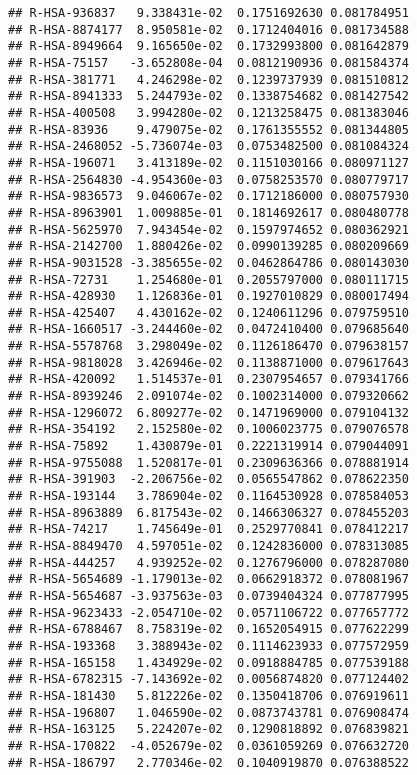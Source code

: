 \documentclass[
]{article}
\begin{document}
\begin{verbatim}
## R-HSA-936837   9.338431e-02  0.1751692630 0.081784951
## R-HSA-8874177  8.950581e-02  0.1712404016 0.081734588
## R-HSA-8949664  9.165650e-02  0.1732993800 0.081642879
## R-HSA-75157   -3.652808e-04  0.0812190936 0.081584374
## R-HSA-381771   4.246298e-02  0.1239737939 0.081510812
## R-HSA-8941333  5.244793e-02  0.1338754682 0.081427542
## R-HSA-400508   3.994280e-02  0.1213258475 0.081383046
## R-HSA-83936    9.479075e-02  0.1761355552 0.081344805
## R-HSA-2468052 -5.736074e-03  0.0753482500 0.081084324
## R-HSA-196071   3.413189e-02  0.1151030166 0.080971127
## R-HSA-2564830 -4.954360e-03  0.0758253570 0.080779717
## R-HSA-9836573  9.046067e-02  0.1712186000 0.080757930
## R-HSA-8963901  1.009885e-01  0.1814692617 0.080480778
## R-HSA-5625970  7.943454e-02  0.1597974652 0.080362921
## R-HSA-2142700  1.880426e-02  0.0990139285 0.080209669
## R-HSA-9031528 -3.385655e-02  0.0462864786 0.080143030
## R-HSA-72731    1.254680e-01  0.2055797000 0.080111715
## R-HSA-428930   1.126836e-01  0.1927010829 0.080017494
## R-HSA-425407   4.430162e-02  0.1240611296 0.079759510
## R-HSA-1660517 -3.244460e-02  0.0472410400 0.079685640
## R-HSA-5578768  3.298049e-02  0.1126186470 0.079638157
## R-HSA-9818028  3.426946e-02  0.1138871000 0.079617643
## R-HSA-420092   1.514537e-01  0.2307954657 0.079341766
## R-HSA-8939246  2.091074e-02  0.1002314000 0.079320662
## R-HSA-1296072  6.809277e-02  0.1471969000 0.079104132
## R-HSA-354192   2.152580e-02  0.1006023775 0.079076578
## R-HSA-75892    1.430879e-01  0.2221319914 0.079044091
## R-HSA-9755088  1.520817e-01  0.2309636366 0.078881914
## R-HSA-391903  -2.206756e-02  0.0565547862 0.078622350
## R-HSA-193144   3.786904e-02  0.1164530928 0.078584053
## R-HSA-8963889  6.817543e-02  0.1466306327 0.078455203
## R-HSA-74217    1.745649e-01  0.2529770841 0.078412217
## R-HSA-8849470  4.597051e-02  0.1242836000 0.078313085
## R-HSA-444257   4.939252e-02  0.1276796000 0.078287080
## R-HSA-5654689 -1.179013e-02  0.0662918372 0.078081967
## R-HSA-5654687 -3.937563e-03  0.0739404324 0.077877995
## R-HSA-9623433 -2.054710e-02  0.0571106722 0.077657772
## R-HSA-6788467  8.758319e-02  0.1652054915 0.077622299
## R-HSA-193368   3.388943e-02  0.1114623933 0.077572959
## R-HSA-165158   1.434929e-02  0.0918884785 0.077539188
## R-HSA-6782315 -7.143692e-02  0.0056874820 0.077124402
## R-HSA-181430   5.812226e-02  0.1350418706 0.076919611
## R-HSA-196807   1.046590e-02  0.0873743781 0.076908474
## R-HSA-163125   5.224207e-02  0.1290818892 0.076839821
## R-HSA-170822  -4.052679e-02  0.0361059269 0.076632720
## R-HSA-186797   2.770346e-02  0.1040919870 0.076388522

\end{verbatim}
\end{document}
